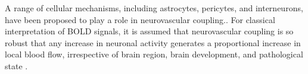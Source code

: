 A range of cellular mechanisms, including astrocytes, pericytes, and interneurons, have been proposed to play a role in neurovascular coupling.\cite{Hillman2014}. For classical interpretation of \gls{BOLD} signals, it is assumed that neurovascular coupling is so robust that any increase in neuronal activity generates a proportional increase in local blood flow, irrespective of brain region, brain development, and pathological state \cite{Logothetis2010}.